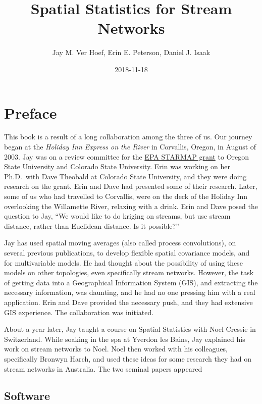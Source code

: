\documentclass[]{book}
\title{Spatial Statistics for Stream Networks}
\author{Jay M. Ver Hoef, Erin E. Peterson, Daniel J. Isaak}
\date{2018-11-18}
\theoremstyle{definition}
\theoremstyle{definition}
\theoremstyle{definition}
\theoremstyle{remark}
\begin{document}
\maketitle

{
\setcounter{tocdepth}{1}
\tableofcontents
}
\hypertarget{preface}{%
\chapter*{Preface}\label{preface}}

This book is a result of a long collaboration among the three of us. Our
journey began at the \emph{Holiday Inn Express on the River} in
Corvallis, Oregon, in August of 2003. Jay was on a review committee for
the
\href{https://cfpub.epa.gov/ncer_abstracts/index.cfm/fuseaction/display.abstractDetail/abstract/7821/report/0}{EPA
STARMAP grant} to Oregon State University and Colorado State University.
Erin was working on her Ph.D.~with Dave Theobald at Colorado State
University, and they were doing research on the grant. Erin and Dave had
presented some of their research. Later, some of us who had travelled to
Corvallis, were on the deck of the Holiday Inn overlooking the
Willamette River, relaxing with a drink. Erin and Dave posed the
question to Jay, ``We would like to do kriging on streams, but use
stream distance, rather than Euclidean distance. Is it possible?''

Jay has used spatial moving averages (also called process convolutions),
on several previous publications, to develop flexible spatial covariance
models, and for multivariable models. He had thought about the
possibility of using these models on other topologies, even specifically
stream networks. However, the task of getting data into a Geographical
Information System (GIS), and extracting the necessary information, was
daunting, and he had no one pressing him with a real application. Erin
and Dave provided the necessary push, and they had extensive GIS
experience. The collaboration was initiated.

About a year later, Jay taught a course on Spatial Statistics with Noel
Cressie in Switzerland. While soaking in the spa at Yverdon les Bains,
Jay explained his work on stream networks to Noel. Noel then worked with
his colleagues, specifically Bronwyn Harch, and used these ideas for
some research they had on stream networks in Australia. The two seminal
papers appeared

\hypertarget{software}{%
\section*{Software}\label{software}}
\end{document}
